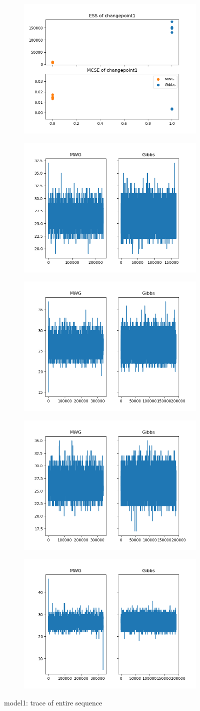 \begin{figure}[h]
    \centering
    \begin{subfigure}
    	\centering
        \includegraphics[width=0.3\linewidth]{../../plots/ess_se_M2_N50_NMCMC1_seed0_diffind2.png}
    \end{subfigure}
    \begin{subfigure}
        \centering
    	\includegraphics[width=0.3\linewidth]{../../plots/Trace_M2_N50_NMCMC1_seed1_diffind2.png}
	\end{subfigure}
	\begin{subfigure}
	    \centering
    	\includegraphics[width=0.3\linewidth]{../../plots/Trace_M2_N50_NMCMC1_seed2_diffind2.png}
	\end{subfigure}
	\begin{subfigure}
	    \centering
    	\includegraphics[width=0.3\linewidth]{../../plots/Trace_M2_N50_NMCMC1_seed3_diffind2.png}
	\end{subfigure}
	\begin{subfigure}
	    \centering
    	\includegraphics[width=0.3\linewidth]{../../plots/Trace_M2_N50_NMCMC1_seed4_diffind2.png}
	\end{subfigure}
	\caption{model1: trace of entire sequence}
\end{figure}

